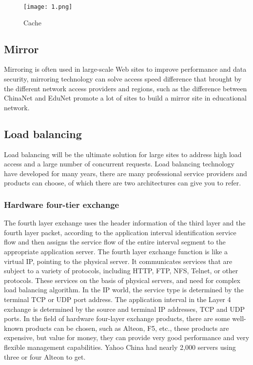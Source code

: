 \documentclass[a4paper]{article}
\begin{document}
\begin{figure}[htbp]
\centering
\texttt{[image: 1.png]}
%
\caption{Cache}\label{fig:digi}
\end{figure}

\subsection{Mirror}
Mirroring is often used in large-scale Web sites to improve performance and data security, mirroring technology can solve access speed difference that brought by the different network access providers and regions, such as the difference between ChinaNet and EduNet promote a lot of sites to build a mirror site in educational network.

\subsection{Load balancing}

Load balancing will be the ultimate solution for large sites to address high load access and a large number of concurrent requests. Load balancing technology have developed for many years, there are many professional service providers and products can choose, of which there are two architectures can give you to refer.
\subsubsection{Hardware four-tier exchange}
The fourth layer exchange uses the header information of the third layer and the fourth layer packet, according to the application interval identification service flow and then assigns the service flow of the entire interval segment to the appropriate application server. The fourth layer exchange function is like a virtual IP, pointing to the physical server. It communicates services that are subject to a variety of protocols, including HTTP, FTP, NFS, Telnet, or other protocols. These services on the basis of physical servers, and need for complex load balancing algorithm. In the IP world, the service type is determined by the terminal TCP or UDP port address. The application interval in the Layer 4 exchange is determined by the source and terminal IP addresses, TCP and UDP ports. In the field of hardware four-layer exchange products, there are some well-known products can be chosen, such as Alteon, F5, etc., these products are expensive, but value for money, they can provide very good performance and very flexible management capabilities. Yahoo China had nearly 2,000 servers using three or four Alteon to get.
\end{document}
